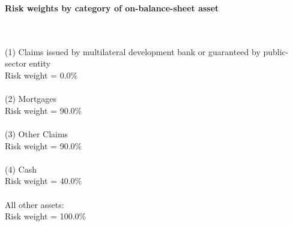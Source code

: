 \documentclass{article}
\begin{document}
\setlength{\parindent}{0em}
\begin{center}{\bf Risk weights by category of on-balance-sheet asset}\end{center}
~\\
~\\

(1) Claims issued by multilateral development bank or guaranteed by public-sector entity \\
Risk weight = 0.0\%\\

~\\
(2) Mortgages \\
Risk weight = 90.0\%\\

~\\
(3) Other Claims\\
Risk weight = 90.0\%\\

~\\
(4) Cash \\
Risk weight = 40.0\%\\

~\\
All other assets:\\
Risk weight = 100.0\%\\

~\\
\end{document}
